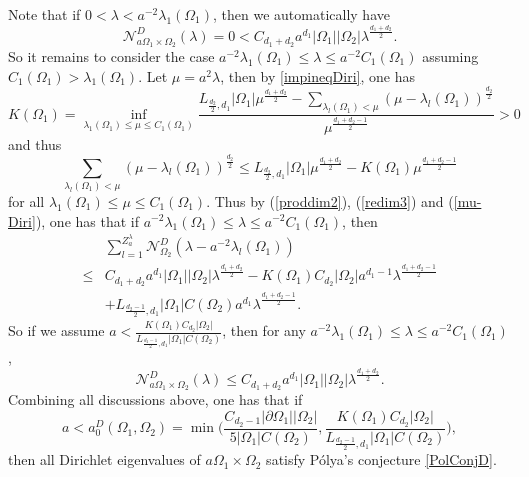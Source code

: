 \documentclass[11pt,letterpaper]{amsart}
\numberwithin{equation}{section}
\theoremstyle{plain}
\theoremstyle{plain}
\numberwithin{equation}{section}
\theoremstyle{remark}
\begin{document}
	Note that if $0< \lambda< a^{-2} \lambda_1(\Omega_1)$, then we automatically have 
	\[
	\mathcal N^D_{a\Omega_1\times \Omega_2}(\lambda)=0< C_{d_1+d_2}a^{d_1}|\Omega_1||\Omega_2|\lambda^{\frac{d_1+d_2}{2}}.
	\] 
	So it remains to consider the case $a^{-2}\lambda_1(\Omega_1)\le \lambda\le a^{-2} C_1(\Omega_1)$ assuming $C_1(\Omega_1)> \lambda_1(\Omega_1)$. %
	Let $\mu= a^2\lambda$, then by \eqref{impineqDiri},
	one has
	\[
	K(\Omega_1)= \inf_{\lambda_1(\Omega_1)\le \mu\le C_1(\Omega_1)} \frac{L_{\frac{d_2}{2},d_1} |\Omega_1| \mu^{\frac{d_1+d_2}{2}}- \sum_{\lambda_l(\Omega_1)<\mu} (\mu- \lambda_l(\Omega_1))^{\frac{d_2}{2}}}{\mu^{\frac{d_1+d_2-1}{2}}}> 0
	\]
	and thus 
	\begin{equation}\label{mu-Diri}
		\sum_{\lambda_l(\Omega_1)<\mu} (\mu- \lambda_l(\Omega_1))^{\frac{d_2}{2}}\le L_{\frac{d_2}{2},d_1} |\Omega_1| \mu^{\frac{d_1+d_2}{2}}- K(\Omega_1) \mu^{\frac{d_1+d_2-1}{2}} 
	\end{equation}
	for all $\lambda_1(\Omega_1)\le \mu\le C_1(\Omega_1)$. Thus by (\ref{proddim2}), (\ref{redim3}) and (\ref{mu-Diri}), one has that if $a^{-2}\lambda_1(\Omega_1)\le \lambda\le a^{-2} C_1(\Omega_1)$, then
	\[
	\begin{aligned}
		&\sum_{l=1}^{Z^\lambda_a} \mathcal N^D_{\Omega_2} (\lambda- a^{-2}\lambda_l(\Omega_1))\\
		\le&C_{d_1+d_2}a^{d_1}|\Omega_1||\Omega_2|\lambda^{\frac{d_1+d_2}{2}}-K(\Omega_1)C_{d_2}|\Omega_2|a^{d_1-1}\lambda^{\frac{d_1+d_2-1}{2}}\\
		&+ L_{\frac{d_2-1}{2}, d_1}|\Omega_1| C(\Omega_2) a^{d_1}\lambda^{\frac{d_1+d_2-1}{2}}.
	\end{aligned}
	\]
	So if we assume $a< \frac{K(\Omega_1)C_{d_2}|\Omega_2|}{L_{\frac{d_2-1}{2}, d_1}|\Omega_1| C(\Omega_2)}$, then for any $a^{-2}\lambda_1(\Omega_1)\le \lambda\le a^{-2} C_1(\Omega_1)$,   
	\[
	\mathcal N^D_{a\Omega_1 \times \Omega_2}(\lambda)\le C_{d_1+d_2}a^{d_1}|\Omega_1||\Omega_2|\lambda^{\frac{d_1+d_2}{2}}.
	\]
	Combining  all discussions above, one has that if 
	\[
	a< a_0^D(\Omega_1, \Omega_2) = \min\bigg(\frac{C_{d_2-1} |\partial \Omega_1| |\Omega_2|}{5 |\Omega_1| C(\Omega_2) }, \frac{K(\Omega_1)C_{d_2}|\Omega_2|}{L_{\frac{d_2-1}{2}, d_1}|\Omega_1| C(\Omega_2)}\bigg),
	\]
	then all Dirichlet eigenvalues of $a\Omega_1\times \Omega_2$ satisfy P\'olya's conjecture \eqref{PolConjD}. 
	
\end{document}
